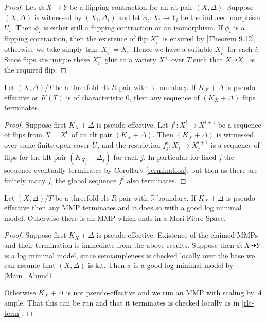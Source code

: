 	\begin{proof}
	Let $\phi:X \to Y$ be a flipping contraction for an rlt pair $(X,\Delta)$. Suppose $(X,\Delta)$ is witnessed by $(X_{i},\Delta_{i})$ and let $\phi_{i}:X_{i} \to Y_{i}$ be the induced morphism $U_{i}$. Then $\phi_{i}$ is either still a flipping contraction or an isomorphism. If $\phi_{i}$ is a flipping contraction, then the existence of flip $X_{i}^{+}$ is ensured by \cite{bhatt2020}[Theorem 9.12], otherwise we take simply take $X_{i}^{+}=X_{i}$. Hence we have a suitable $X_{i}^{+}$ for each $i$. Since flips are unique these $X_{i}^{+}$ glue to a variety $X^{+}$ over $T$ such that $X \dashrightarrow X^{+}$ is the required flip.
	\end{proof}
	
	\begin{theorem}\label{rlt-term}
		Let $(X,\Delta)/T$ be a threefold rlt $R$-pair with $\mathbb{R}$-boundary. If $K_{X}+\Delta$ is pseudo-effective or $K(T)$ is of characteristic $0$, then any sequence of $(K_{X}+\Delta)$ flips terminates.
	\end{theorem}
	
	\begin{proof}
		
		Suppose first $K_{X}+\Delta$ is pseudo-effective. Let $f^{i}:X^{i} \to X^{i+1}$ be a sequence of flips from $X=X^{0}$ of an rlt pair $(K_{X}+\Delta)$. Then $(K_{X}+\Delta)$ is witnessed over some finite open cover $U_{j}$ and the restriction $f^{i}_{j}:X_{j}^{i} \to X_{j}^{i+1}$ is a sequence of flips for the klt pair $(K_{X_{j}}+\Delta_{j})$ for each $j$. In particular for fixed $j$ the sequence eventually terminates by Corollary \ref{termination}, but then as there are finitely many $j$, the global sequence $f^{i}$ also terminates.
	\end{proof}

\begin{theorem}\label{rltmmp}
	Let $(X,\Delta)/T$ be a threefold rlt $R$-pair with $\mathbb{R}$-boundary. If $K_{X}+\Delta$ is pseudo-effective then any MMP terminates and it does so with a good log minimal model. Otherwise there is an MMP which ends in a Mori Fibre Space. 
\end{theorem}


\begin{proof}
	Suppose first $K_{X}+\Delta$ is pseudo-effective.
	Existence of the claimed MMPs and their termination is immediate from the above results. Suppose then $\phi:X \dashrightarrow Y$ is a log minimal model, since semiampleness is checked locally over the base we can assume that $(X,\Delta)$ is klt. Then $\phi$ is a good log minimal model by \autoref{Main_Abund1}.
	
	Otherwise $K_{X}+\Delta$ is not pseudo-effective and we run an MMP with scaling by $A$ ample. That this can be run and that it terminates is checked locally as in \autoref{rlt-term}.
\end{proof}

